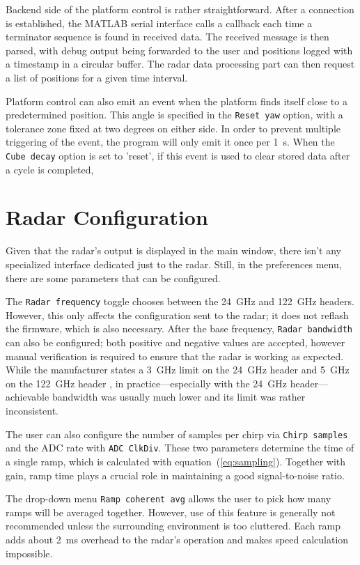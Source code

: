 Backend side of the platform control is rather straightforward.
After a connection is established, the MATLAB serial interface calls a callback each time a terminator sequence is found in received data.
The received message is then parsed, with debug output being forwarded to the user and positions logged with a timestamp in a circular buffer.
The radar data processing part can then request a list of positions for a given time interval.

Platform control can also emit an event when the platform finds itself close to a predetermined position.
This angle is specified in the \texttt{Reset yaw} option, with a tolerance zone fixed at two degrees on either side.
In order to prevent multiple triggering of the event, the program will only emit it once per 1~s.
When the \texttt{Cube decay} option is set to 'reset', if this event is used to clear stored data after a cycle is completed,

\section{Radar Configuration}

Given that the radar's output is displayed in the main window, there isn't any specialized interface dedicated just to the radar.
Still, in the preferences menu, there are some parameters that can be configured.

The \texttt{Radar frequency} toggle chooses between the 24~GHz and 122~GHz headers.
However, this only affects the configuration sent to the radar; it does not reflash the firmware, which is also necessary.
After the base frequency, \texttt{Radar bandwidth} can also be configured; both positive and negative values are accepted, however manual verification is required to ensure that the radar is working as expected.
While the manufacturer states a 3~GHz limit on the 24~GHz header and 5~GHz on the 122~GHz header \cite{siradPRO}, in practice—especially with the 24~GHz header—achievable bandwidth was usually much lower and its limit was rather inconsistent.

The user can also configure the number of samples per chirp via \texttt{Chirp samples} and the ADC rate with \texttt{ADC ClkDiv}.
These two parameters determine the time of a single ramp, which is calculated with equation~(\ref{eq:sampling}).
Together with gain, ramp time plays a crucial role in maintaining a good signal-to-noise ratio.

The drop-down menu \texttt{Ramp coherent avg} allows the user to pick how many ramps will be averaged together.
However, use of this feature is generally not recommended unless the surrounding environment is too cluttered.
Each ramp adds about 2~ms overhead to the radar's operation and makes speed calculation impossible.

